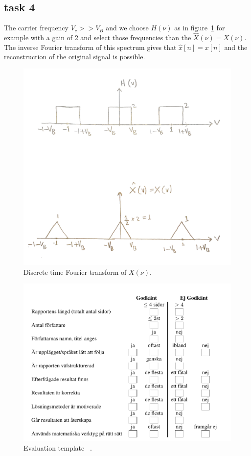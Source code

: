 \documentclass[a4paper,twocolumn]{article}
\begin{document}
\subsection{task 4}
The carrier frequency $V_c >> V_B$
and we choose $H(\nu)$ as in figure~\ref{fig:prestanda} for example with a gain of 2 and select those frequencies than the $\hat{X}(\nu) = X(\nu)$. The inverse Fourier transform of this spectrum gives that $\hat{x}[n] = x[n]$ and the reconstruction of the original signal is possible.


\begin{figure}[H]
  \begin{center}
    \includegraphics[width=0.83\columnwidth]{task1corped.pdf}
  \end{center}
  \caption{Discrete time Fourier transform of $X(\nu)$.}
  \label{fig:prestanda}
\end{figure}

\begin{figure}[H]
  \begin{center}
    \includegraphics[width=\columnwidth]{evatab.png}
  \end{center}
  \caption{Evaluation template ~\cite{pek}.}
  \label{fig:evatable}
\end{figure}
\end{document}
